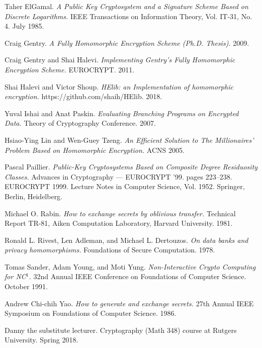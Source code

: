 Taher ElGamal.
{\sl A Public Key Cryptosystem and a Signature Scheme Based on Discrete Logarithms.}
IEEE Transactions on Information Theory, Vol. IT-31, No. 4.
July 1985.

Craig Gentry.
{\sl A Fully Homomorphic Encryption Scheme (Ph.D. Thesis).}
2009.

Craig Gentry and Shai Halevi.
{\sl Implementing Gentry's Fully Homomorphic Encryption Scheme.}
EUROCRYPT.
2011.

Shai Halevi and Victor Shoup.
{\sl HElib: an Implementation of homomorphic encryption.}
https://github.com/shaih/HElib.
2018.

Yuval Ishai and Anat Paskin.
{\sl Evaluating Branching Programs on Encrypted Data.}
Theory of Cryptography Conference.
2007.

Hsiao-Ying Lin and Wen-Guey Tzeng.
{\sl An Efficient Solution to The Millionaires' Problem Based on Homomorphic Encryption.}
ACNS 2005.

Pascal Paillier.
{\sl Public-Key Cryptosystems Based on Composite Degree Residuosity Classes.}
Advances in Cryptography --- EUROCRYPT '99. pages 223--238.
EUROCRYPT 1999.
Lecture Notes in Computer Science, Vol. 1952. Springer, Berlin, Heidelberg.

Michael O. Rabin.
{\sl How to exchange secrets by oblivious transfer.}
Technical Report TR-81, Aiken Computation Laboratory, Harvard University.
1981.

Ronald L. Rivest, Len Adleman, and Michael L. Dertouzos.
{\sl On data banks and privacy homomorphisms.}
Foundations of Secure Computation.
1978.

Tomas Sander, Adam Young, and Moti Yung.
{\sl Non-Interactive Crypto Computing for {\it NC}${}^1$.}
32nd Annual IEEE Conference on Foundations of Computer Science.
October 1991.

Andrew Chi-chih Yao.
{\sl How to generate and exchange secrets.}
27th Annual IEEE Symposium on Foundations of Computer Science.
1986.

Danny the substitute lecturer.
Cryptography (Math 348) course at Rutgers University.
Spring 2018.
\bye
